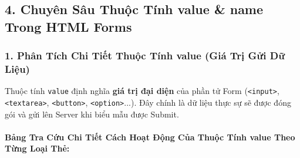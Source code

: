 \documentclass[11pt,oneside]{book}
\newcommand{\codeinline}[1]{\textcolor{accentOrange}{\texttt{#1}}}
\begin{document}
\subsection{4. Chuyên Sâu Thuộc Tính value \& name Trong HTML Forms}

\subsubsection{1. Phân Tích Chi Tiết Thuộc Tính value (Giá Trị Gửi Dữ Liệu)}

\begin{conceptBox}
Thuộc tính \codeinline{value} định nghĩa \textbf{giá trị đại diện} của phần tử Form (\codeinline{<input>}, \codeinline{<textarea>}, \codeinline{<button>}, \codeinline{<option>}...). Đây chính là dữ liệu thực sự sẽ được đóng gói và gửi lên Server khi biểu mẫu được Submit.
\end{conceptBox}

\paragraph{Bảng Tra Cứu Chi Tiết Cách Hoạt Động Của Thuộc Tính value Theo Từng Loại Thẻ:}
\end{document}
